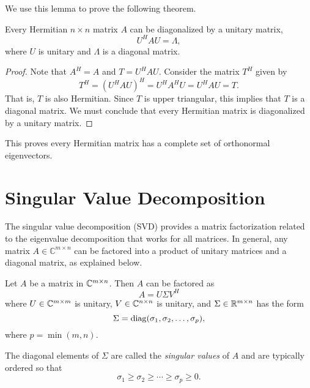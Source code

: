 We use this lemma to prove the following theorem.

\begin{theorem} \label{theorem:HermitanDiagonalizable}
Every Hermitian $n \times n$ matrix $A$ can be diagonalized by a unitary matrix,
\begin{equation*}
U^H A U = \Lambda,
\end{equation*}
where $U$ is unitary and $\Lambda$ is a diagonal matrix.
\end{theorem}

\begin{proof}
Note that $A^H = A$ and $T = U^H A U$.
Consider the matrix $T^H$ given by
\begin{equation*}
T^H = (U^H A U)^H = U^H A^H U = U^H A U = T.
\end{equation*}
That is, $T$ is also Hermitian.
Since $T$ is upper triangular, this implies that $T$ is a diagonal matrix.
We must conclude that every Hermitian matrix is diagonalized by a unitary matrix.
\end{proof}

This proves every Hermitian matrix has a complete set of orthonormal eigenvectors.


\section{Singular Value Decomposition}

The singular value decomposition (SVD) provides a matrix factorization related to the eigenvalue decomposition that works for all matrices.
In general, any matrix $A \in \mathbb{C}^{m \times n}$ can be factored into a product of unitary matrices and a diagonal matrix, as explained below.

\begin{theorem}
Let $A$ be a matrix in $\mathbb{C}^{m \times n}$.
Then $A$ can be factored as
\begin{equation*}
A = U \Sigma V^H
\end{equation*}
where $U \in \mathbb{C}^{m \times m}$ is unitary, $V \in \mathbb{C}^{n \times n}$ is unitary, and $\Sigma \in \mathbb{R}^{m \times n}$ has the form
\begin{equation*}
\Sigma = \mathrm{diag} ( \sigma_1, \sigma_2, \ldots, \sigma_p ),
\end{equation*}
where $p = \min (m,n)$.
\end{theorem}

The diagonal elements of $\Sigma$ are called the \emph{singular values} of $A$ and are typically ordered so that
\begin{equation*}
\sigma_1 \geq \sigma_2 \geq \cdots \geq \sigma_p \geq 0.
\end{equation*}

